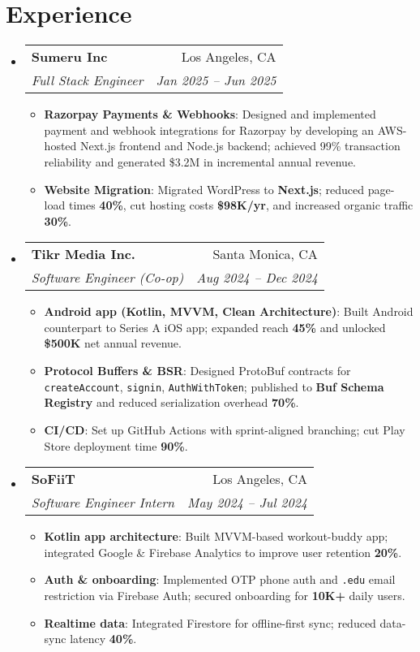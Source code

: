 \documentclass[letterpaper,11pt]{article}
\makeatletter
\newcommand{\resumeItem}[2]{\item\small{\textbf{#1}{: #2 \vspace{-2pt}}}}
\newcommand{\resumeSubheading}[4]{
  \vspace{-1pt}\item
    \begin{tabular*}{0.97\textwidth}[t]{l@{\extracolsep{\fill}}r}
      \textbf{#1} & #2 \\
      \textit{\small#3} & \textit{\small #4} \\
    \end{tabular*}\vspace{-5pt}
}
\newcommand{\resumeSubHeadingListStart}{\begin{itemize}[leftmargin=*]}
\newcommand{\resumeSubHeadingListEnd}{\end{itemize}}
\newcommand{\resumeItemListStart}{\begin{itemize}}
\newcommand{\resumeItemListEnd}{\end{itemize}\vspace{-5pt}}
\makeatother
\begin{document}
\section{Experience}
\resumeSubHeadingListStart

  \resumeSubheading
    {Sumeru Inc}{Los Angeles, CA}
    {Full Stack Engineer}{Jan 2025 -- Jun 2025}
    \resumeItemListStart
      \resumeItem{Razorpay Payments \& Webhooks}{Designed and implemented payment and webhook integrations for Razorpay by developing an AWS-hosted Next.js frontend and Node.js backend; achieved 99\% transaction reliability and generated \$3.2M in incremental annual revenue.}
      \resumeItem{Website Migration}{Migrated WordPress to \textbf{Next.js}; reduced page-load times \textbf{40\%}, cut hosting costs \textbf{\$98K/yr}, and increased organic traffic \textbf{30\%}.}
    \resumeItemListEnd

  \resumeSubheading
    {Tikr Media Inc.}{Santa Monica, CA}
    {Software Engineer (Co-op)}{Aug 2024 -- Dec 2024}
    \resumeItemListStart
      \resumeItem{Android app (Kotlin, MVVM, Clean Architecture)}{Built Android counterpart to Series A iOS app; expanded reach \textbf{45\%} and unlocked \textbf{\$500K} net annual revenue.}
      \resumeItem{Protocol Buffers \& BSR}{Designed ProtoBuf contracts for \texttt{createAccount}, \texttt{signin}, \texttt{AuthWithToken}; published to \textbf{Buf Schema Registry} and reduced serialization overhead \textbf{70\%}.}
      \resumeItem{CI/CD}{Set up GitHub Actions with sprint-aligned branching; cut Play Store deployment time \textbf{90\%}.}
    \resumeItemListEnd

  \resumeSubheading
    {SoFiiT}{Los Angeles, CA}
    {Software Engineer Intern}{May 2024 -- Jul 2024}
    \resumeItemListStart
      \resumeItem{Kotlin app architecture}{Built MVVM-based workout-buddy app; integrated Google \& Firebase Analytics to improve user retention \textbf{20\%}.}
      \resumeItem{Auth \& onboarding}{Implemented OTP phone auth and \texttt{.edu} email restriction via Firebase Auth; secured onboarding for \textbf{10K+} daily users.}
      \resumeItem{Realtime data}{Integrated Firestore for offline-first sync; reduced data-sync latency \textbf{40\%}.}
    \resumeItemListEnd

\resumeSubHeadingListEnd

\end{document}
